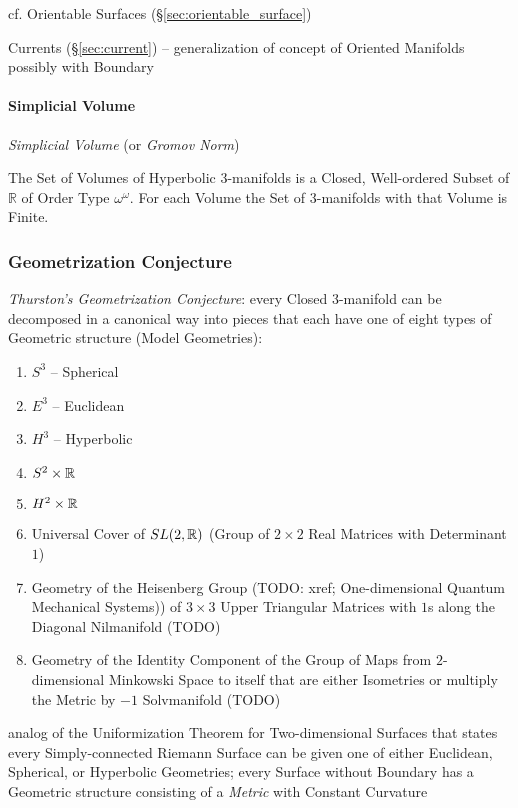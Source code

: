 cf. Orientable Surfaces (\S\ref{sec:orientable_surface})

\fist Currents (\S\ref{sec:current}) -- generalization of concept of Oriented
Manifolds possibly with Boundary



\paragraph{Simplicial Volume}\label{sec:simplicial_volume}\hfill

\emph{Simplicial Volume} (or \emph{Gromov Norm})

The Set of Volumes of Hyperbolic 3-manifolds is a Closed, Well-ordered
Subset of $\mathbb{R}$ of Order Type $\omega^\omega$. For each Volume
the Set of 3-manifolds with that Volume is Finite.



\subsubsection{Geometrization Conjecture}
\label{sec:geometrization_conjecture}

\emph{Thurston's Geometrization Conjecture}: every Closed 3-manifold can be
decomposed in a canonical way into pieces that each have one of eight types of
Geometric structure (Model Geometries):
\begin{enumerate}
  \item $S^3$ -- Spherical
  \item $E^3$ -- Euclidean
  \item $H^3$ -- Hyperbolic
  \item $S^2 \times \mathbb{R}$
  \item $H^2 \times \mathbb{R}$
  \item Universal Cover of $SL(2, \mathbb{R})$ (Group of $2 \times 2$ Real Matrices
    with Determinant $1$)
  \item Geometry of the Heisenberg Group (TODO: xref;
    One-dimensional Quantum Mechanical Systems)) of $3 \times 3$ Upper
    Triangular Matrices with $1$s along the Diagonal
    \fist Nilmanifold (TODO)
  \item Geometry of the Identity Component of the Group of Maps from
    $2$-dimensional Minkowski Space to itself that are either Isometries or
    multiply the Metric by $-1$
    \fist Solvmanifold (TODO)
\end{enumerate}

analog of the Uniformization Theorem for Two-dimensional Surfaces that states
every Simply-connected Riemann Surface can be given one of either Euclidean,
Spherical, or Hyperbolic Geometries; every Surface without Boundary has a
Geometric structure consisting of a \emph{Metric} with Constant Curvature



